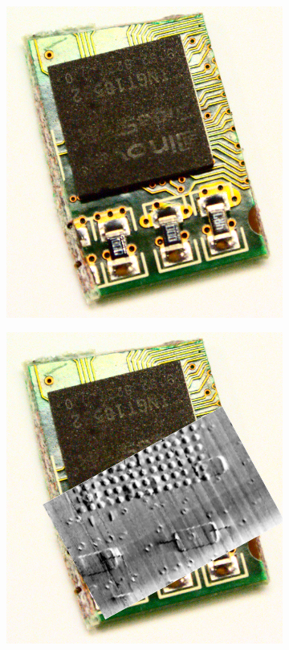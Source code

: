 \begin{figure}[htb]
    \centering
    \begin{subfigure}[b]{.49\textwidth}
    \centering
    \includegraphics[width=\textwidth]{gfx/mythen-edge-on/chip_overlay_empy.png}
    \caption{}
    \end{subfigure}
    \begin{subfigure}[b]{.49\textwidth}
    \centering
    \includegraphics[width=\textwidth]{gfx/mythen-edge-on/chip_overlay_full.png}

\end{subfigure}
\end{figure}
